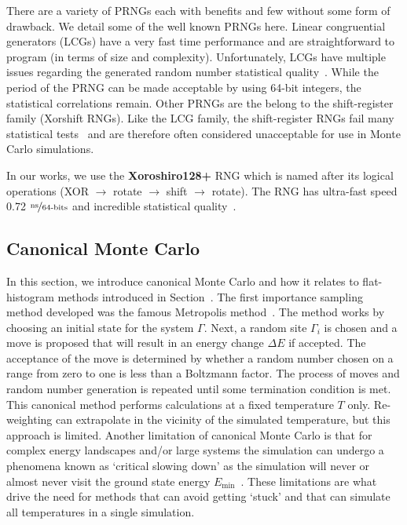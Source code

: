 There are a variety of PRNGs each with benefits and few without some form of drawback. We detail some of the well known PRNGs here. Linear congruential generators (LCGs) have a very fast time performance and are straightforward to program (in terms of size and complexity). Unfortunately, LCGs have multiple issues regarding the generated random number statistical quality~\cite{coddington1994analysis, barry1996recommendations}. While the period of the PRNG can be made acceptable by using 64-bit integers, the statistical correlations remain. Other PRNGs are the belong to the shift-register family (Xorshift RNGs). Like the LCG family, the shift-register RNGs fail many statistical tests~\cite{panneton2005xorshift} and are therefore often considered unacceptable for use in Monte Carlo simulations.

In our works, we use the \textbf{Xoroshiro128+} RNG which is named after its logical operations (XOR $\xrightarrow{}$ rotate $\xrightarrow{}$ shift $\xrightarrow{}$ rotate). The RNG has ultra-fast speed 0.72 $\nicefrac{\text{ns}}{\text{64-bits}}$ and incredible statistical quality~\cite{blackman2018scrambled}.

\subsection{Canonical Monte Carlo}\label{cmc}
In this section, we introduce canonical Monte Carlo and how it relates to flat-histogram methods introduced in Section~. The first importance sampling method developed was the famous Metropolis method~\cite{metropolis1953equation}.  The method works by choosing an initial state for the system $\Gamma$. Next, a random site $\Gamma_i$ is chosen and a move is proposed that will result in an energy change $\Delta E$ if accepted. The acceptance of the move is determined by whether a random number chosen on a range from zero to one is less than a Boltzmann factor. The process of moves and random number generation is repeated until some termination condition is met. This canonical method performs calculations at a fixed temperature $T$ only. Re-weighting can extrapolate in the vicinity of the simulated temperature, but this approach is limited. Another limitation of canonical Monte Carlo is that for complex energy landscapes and/or large systems the simulation can undergo a phenomena known as `critical slowing down' as the simulation will never or almost never visit the ground state energy $E_{\min}$~\cite{berg2000introduction}. These limitations are what drive the need for methods that can avoid getting `stuck' and that can simulate all temperatures in a single simulation.

